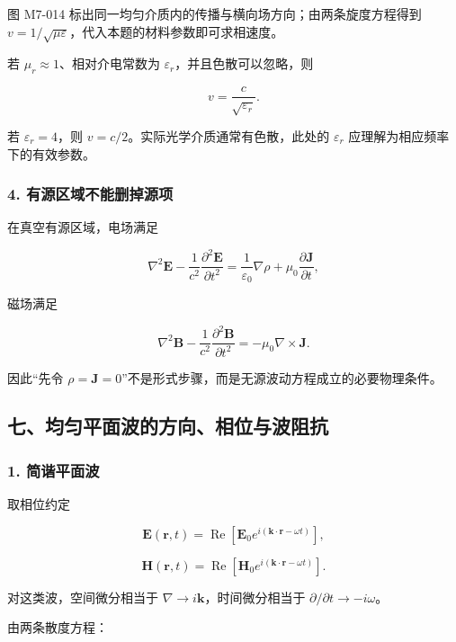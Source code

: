 图 M7-014 标出同一均匀介质内的传播与横向场方向；由两条旋度方程得到
\(v=1/\sqrt{\mu\varepsilon}\)，代入本题的材料参数即可求相速度。

若 \(\mu_r\approx1\)、相对介电常数为
\(\varepsilon_r\)，并且色散可以忽略，则

\[
v=\frac{c}{\sqrt{\varepsilon_r}}.
\]

若 \(\varepsilon_r=4\)，则 \(v=c/2\)。实际光学介质通常有色散，此处的
\(\varepsilon_r\) 应理解为相应频率下的有效参数。

\subsubsection{4.
有源区域不能删掉源项}\label{m7:ux6709ux6e90ux533aux57dfux4e0dux80fdux5220ux6389ux6e90ux9879}

在真空有源区域，电场满足

\[
\boxed{
\nabla^2\mathbf E
-\frac1{c^2}\frac{\partial^2\mathbf E}{\partial t^2}
=\frac1{\varepsilon_0}\nabla\rho
+\mu_0\frac{\partial\mathbf J}{\partial t}
},
\]

磁场满足

\[
\boxed{
\nabla^2\mathbf B
-\frac1{c^2}\frac{\partial^2\mathbf B}{\partial t^2}
=-\mu_0\nabla\times\mathbf J
}.
\]

因此``先令
\(\rho=\mathbf J=0\)''不是形式步骤，而是无源波动方程成立的必要物理条件。

\subsection{七、均匀平面波的方向、相位与波阻抗}\label{m7:ux4e03ux5747ux5300ux5e73ux9762ux6ce2ux7684ux65b9ux5411ux76f8ux4f4dux4e0eux6ce2ux963bux6297}

\subsubsection{1. 简谐平面波}\label{m7:ux7b80ux8c10ux5e73ux9762ux6ce2}

取相位约定

\[
\mathbf E(\mathbf r,t)
=\operatorname{Re}
\left[
\mathbf E_0e^{i(\mathbf k\cdot\mathbf r-\omega t)}
\right],
\]

\[
\mathbf H(\mathbf r,t)
=\operatorname{Re}
\left[
\mathbf H_0e^{i(\mathbf k\cdot\mathbf r-\omega t)}
\right].
\]

对这类波，空间微分相当于 \(\nabla\to i\mathbf k\)，时间微分相当于
\(\partial/\partial t\to-i\omega\)。

由两条散度方程：

